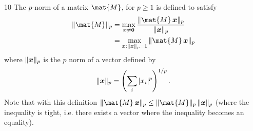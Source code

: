 \documentclass{sotonExamBoxes}    %
\begin{document}


\begin{question}{10}
  The $p$-norm of a matrix $\mat{M}$, for $p\geq 1$ is defined to satisfy
  \begin{align}
    \len{\mat{M}}_p &= \max_{\bm{x}\neq \bm{0}}
    \frac{\len{\mat{M}\,\bm{x}}_p}{\len{\bm{x}}_p} \\
    &= \max_{\bm{x}:\len{\bm{x}}_p=1}\len{\mat{M}\,\bm{x}}_p \label{eq:pnorm2}
  \end{align}
  where $\| \bm{x} \|_p$ is the $p$ norm of a vector defined by
  \begin{align*}
    \| \bm{x} \|_p = \left(  \sum_i |x_i|^p \right)^{1/p}.
  \end{align*}
  Note that with this definition $\len{\mat{M}\,\bm{x}}_p \leq
  \len{\mat{M}}_p \, \len{\bm{x}}_p$ (where the inequality is tight,
  i.e. there exists a vector where the inequality becomes an
  equality).
    


\end{question}
\end{document}
